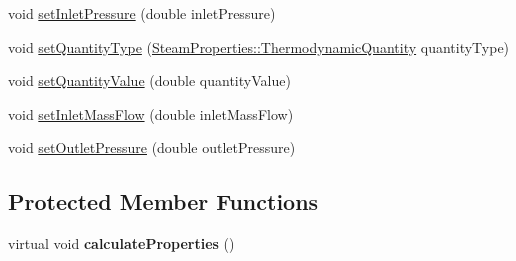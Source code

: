 \begin{DoxyCompactItemize}
\item 
void \hyperlink{class_prv_without_desuperheating_a26039a0a228ca66f96e8402bf741b9d9}{set\+Inlet\+Pressure} (double inlet\+Pressure)
\item 
void \hyperlink{class_prv_without_desuperheating_a212177b7a16c7452358df4120196c04b}{set\+Quantity\+Type} (\hyperlink{class_steam_properties_ae0294bedf7d178c2d8fb6aed0f62fbff}{Steam\+Properties\+::\+Thermodynamic\+Quantity} quantity\+Type)
\item 
void \hyperlink{class_prv_without_desuperheating_a5ed2d0f0f558705d482ed0502131757f}{set\+Quantity\+Value} (double quantity\+Value)
\item 
void \hyperlink{class_prv_without_desuperheating_abeccff2dc91144452b34ca343ee63fa7}{set\+Inlet\+Mass\+Flow} (double inlet\+Mass\+Flow)
\item 
void \hyperlink{class_prv_without_desuperheating_a0f2a4597b58390e5c4a7c75b38bbebbc}{set\+Outlet\+Pressure} (double outlet\+Pressure)
\end{DoxyCompactItemize}
\subsection*{Protected Member Functions}
\begin{DoxyCompactItemize}
\item 
\mbox{\label{class_prv_without_desuperheating_a453e703a9a6fe717e43d26da4d207062}} 
virtual void {\bfseries calculate\+Properties} ()
\end{DoxyCompactItemize}
